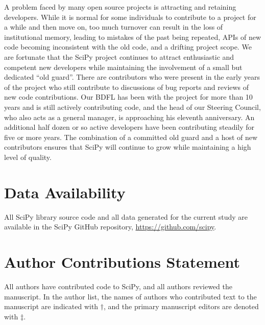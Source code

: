 \documentclass[fleqn,10pt]{wlscirep}
\begin{document}
A problem faced by many open source projects is attracting and retaining developers. While it is normal for some individuals to contribute to a project for a while and then move on, too much turnover can result in the loss of institutional memory, leading to mistakes of the past being repeated, APIs of new code becoming inconsistent with the old code, and a drifting project scope.
We are fortunate that the SciPy project continues to attract enthusiastic and competent new developers while maintaining the involvement of a small but dedicated ``old guard''. There are contributors who were present in the early years of the project who still contribute to discussions of bug reports and reviews of new code contributions. Our BDFL has been with the project for more than 10 years and is still actively contributing code, and the head of our Steering Council, who also acts as a general manager, is approaching his eleventh anniversary. An additional half dozen or so active developers have been contributing steadily for five or more years. The combination of a committed old guard and a host of new contributors ensures that SciPy will continue to grow while maintaining a high level of quality.

\section*{Data Availability}
All SciPy library source code and all data generated for the current study are available in the SciPy GitHub repository, \url{https://github.com/scipy}.



\section*{Author Contributions Statement}

All authors have contributed code to SciPy, and all authors reviewed the manuscript. In the author list, the names of authors who contributed text to the manuscript are indicated with $\dagger$, and the primary manuscript editors are denoted with $\ddagger$.

\end{document}

